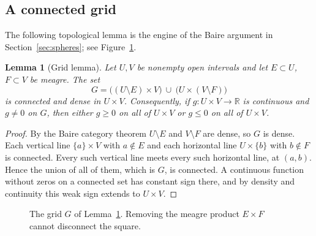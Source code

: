 \documentclass[11pt]{amsart}
\newtheorem{lemma}[theorem]{Lemma}
\theoremstyle{definition}
\theoremstyle{remark}
\begin{document}
\subsection{A connected grid}
The following topological lemma is the engine of the Baire argument in Section~\ref{sec:spheres}; see Figure~\ref{fig:grid}.

\begin{lemma}[Grid lemma]\label{lem:grid}
Let $U,V$ be nonempty open intervals and let $E\subset U$, $F\subset V$ be meagre. The set
\[
 G=\bigl((U\setminus E)\times V\bigr)\ \cup\ \bigl(U\times(V\setminus F)\bigr)
\]
is connected and dense in $U\times V$. Consequently, if $g:U\times V\to\mathbb R$ is continuous and $g\ne0$ on $G$, then either $g\ge0$ on all of $U\times V$ or $g\le0$ on all of $U\times V$.
\end{lemma}
\begin{proof}
By the Baire category theorem $U\setminus E$ and $V\setminus F$ are dense, so $G$ is dense. Each vertical line $\{a\}\times V$ with $a\notin E$ and each horizontal line $U\times\{b\}$ with $b\notin F$ is connected. Every such vertical line meets every such horizontal line, at $(a,b)$. Hence the union of all of them, which is $G$, is connected. A continuous function without zeros on a connected set has constant sign there, and by density and continuity this weak sign extends to $U\times V$.
\end{proof}

\begin{figure}[ht]
\centering
{}
\caption{The grid $G$ of Lemma~\ref{lem:grid}. Removing the meagre product $E\times F$ cannot disconnect the square.}\label{fig:grid}
\end{figure}
\end{document}
